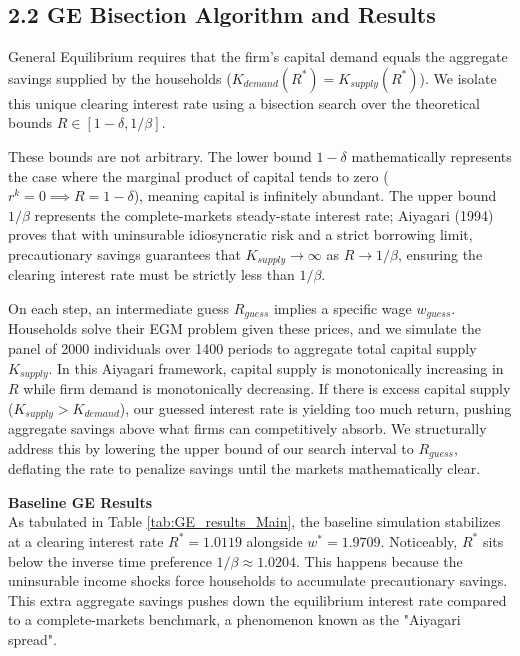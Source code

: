 \documentclass[11pt, a4paper]{article}
\begin{document}
\subsection*{2.2 GE Bisection Algorithm and Results}
General Equilibrium requires that the firm's capital demand equals the aggregate savings supplied by the households ($K_{demand}(R^*) = K_{supply}(R^*)$). We isolate this unique clearing interest rate using a bisection search over the theoretical bounds $R \in [1-\delta, 1/\beta]$. 

These bounds are not arbitrary. The lower bound $1-\delta$ mathematically represents the case where the marginal product of capital tends to zero ($r^k = 0 \implies R = 1 - \delta$), meaning capital is infinitely abundant. The upper bound $1/\beta$ represents the complete-markets steady-state interest rate; Aiyagari (1994) proves that with uninsurable idiosyncratic risk and a strict borrowing limit, precautionary savings guarantees that $K_{supply} \to \infty$ as $R \to 1/\beta$, ensuring the clearing interest rate must be strictly less than $1/\beta$.

On each step, an intermediate guess $R_{guess}$ implies a specific wage $w_{guess}$. Households solve their EGM problem given these prices, and we simulate the panel of 2000 individuals over 1400 periods to aggregate total capital supply $K_{supply}$. In this Aiyagari framework, capital supply is monotonically increasing in $R$ while firm demand is monotonically decreasing. If there is excess capital supply ($K_{supply} > K_{demand}$), our guessed interest rate is yielding too much return, pushing aggregate savings above what firms can competitively absorb. We structurally address this by lowering the upper bound of our search interval to $R_{guess}$, deflating the rate to penalize savings until the markets mathematically clear.

\textbf{Baseline GE Results} \\
As tabulated in Table \ref{tab:GE_results_Main}, the baseline simulation stabilizes at a clearing interest rate $R^* = 1.0119$ alongside $w^* = 1.9709$. Noticeably, $R^*$ sits below the inverse time preference $1/\beta \approx 1.0204$. This happens because the uninsurable income shocks force households to accumulate precautionary savings. This extra aggregate savings pushes down the equilibrium interest rate compared to a complete-markets benchmark, a phenomenon known as the "Aiyagari spread".
\end{document}
